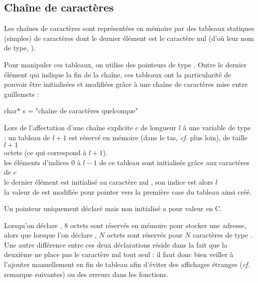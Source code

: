		\begin{Illustration}
		\end{Illustration}
	
	\subsection{Chaîne de caractères}
	
		Les chaînes de caractères sont représentées en mémoire par des tableaux statiques (simples) de caractères dont le dernier élément est le caractère nul  (d'où leur nom de type, ).
		
		\begin{Exemple}
		\end{Exemple}
		
		Pour manipuler ces tableaux, on utilise des pointeurs de type . Outre le dernier élément qui indique la fin de la chaîne, ces tableaux ont la particularité de pouvoir être initialisées et modifiées grâce à une chaîne de caractères mise entre guillemets :
			\begin{C}
					char* s = "chaîne de caractères quelconque"
			\end{C}
		
		Lors de l'affectation d'une chaîne explicite \(c\) de longueur \(l\) à une variable  de type  : \nt
			 \bdot un tableau de \(l+1\)  est réservé en mémoire (dans le tas, \emph{cf.} plus loin), de taille \(l+1\) \\  \listspace octets (ce qui correspond à  \(l+1\)). \\
			 \bdot les éléments d'indices 0 à \(l-1\) de ce tableau sont initialisés grâce aux caractères de \(c\) \\
			 \bdot le dernier élément est initialisé au caractère nul , son indice est alors \(l\) \\
			 \bdot la valeur de  est modifiée pour pointer vers la première case du tableau ainsi créé.
		
		\begin{Remarque}
			Un pointeur uniquement déclaré mais non initialisé a pour valeur  en C.
		\end{Remarque}
	
		\vs{2}
		\begin{Remarque}
			Lorsqu'on déclare , 8 octets sont réservés en mémoire pour stocker une adresse, alors que lorsque l'on déclare , \(N\) octets sont réservés pour \(N\) caractères de type \cc{char}. \nt
			Une autre différence entre ces deux déclarations réside dans la fait que la deuxième ne place pas le caractère nul tout seul : il faut donc bien veiller à l'ajouter manuellement en fin de tableau afin d'éviter des affichages étranges (\emph{cf.} remarque suivantes) ou des erreurs dans les fonctions.
		\end{Remarque}
		
